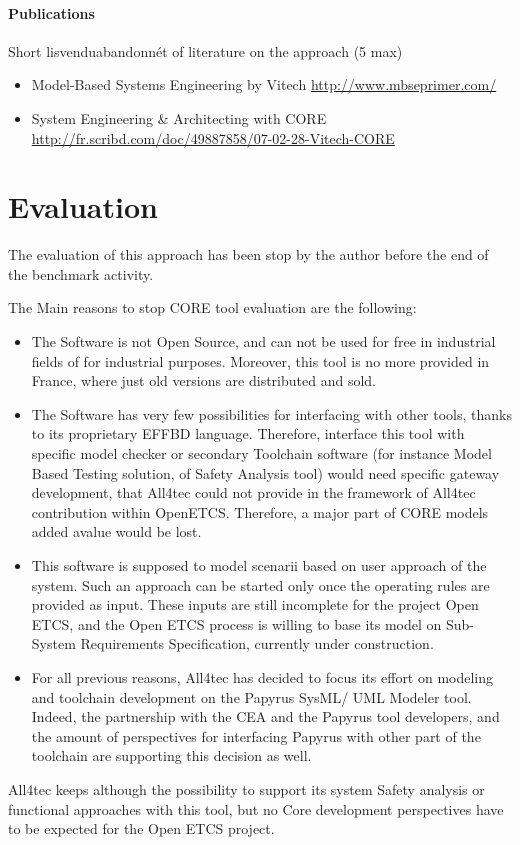 \paragraph{Publications} Short lisvenduabandonnét of literature on the approach (5 max)

\begin{itemize}
\item Model-Based Systems Engineering by Vitech
\url{http://www.mbseprimer.com/}

\item System Engineering \& Architecting with CORE
\url{http://fr.scribd.com/doc/49887858/07-02-28-Vitech-CORE}

\end{itemize}

\section{Evaluation}

The evaluation of this approach has been stop by the author before the end of the benchmark activity.


\begin{author_comment}

The Main reasons to stop CORE tool evaluation are the following:
\begin{itemize}
\item The Software is not Open Source, and can not be used for free in industrial fields of for industrial purposes. Moreover, this tool is no more provided in France, where just old versions are distributed and sold.
\item The Software has very few possibilities for interfacing with other tools, thanks to its proprietary EFFBD language. Therefore, interface this tool with specific model checker or secondary Toolchain software (for instance Model Based Testing solution, of Safety Analysis tool) would need specific gateway development, that All4tec could not provide in the framework of All4tec contribution within OpenETCS. Therefore, a major part of  CORE models added avalue would be lost.
\item This software is supposed to model scenarii based on user approach of the system. Such an approach can be started only once the operating rules are provided as input. These inputs are still incomplete for the project Open ETCS, and the Open ETCS process is willing to base its model on Sub-System Requirements Specification, currently under construction.
\item For all previous reasons, All4tec has decided to focus its effort on modeling and toolchain development on the Papyrus SysML/ UML Modeler tool. Indeed, the partnership with the CEA and the Papyrus tool developers, and the amount of perspectives for interfacing Papyrus with other part of the toolchain are supporting this decision as well.
\end{itemize}

All4tec keeps although the possibility to support its system Safety analysis or functional approaches with this tool, but no Core development perspectives have to be expected for the Open ETCS project.

\end{author_comment}